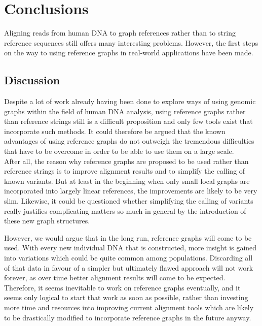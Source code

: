 \documentclass[a4paper,12pt,twoside,BCOR=10mm]{scrbook}
\begin{document}
\chapter{Conclusions}
%

Aligning reads from human DNA to graph references rather than to string reference sequences 
still offers many interesting problems. 
However, the first steps on the way to using reference graphs in real-world applications have been made.

\section{Discussion}

Despite a lot of work already having been done to explore 
ways of using genomic graphs within the field of human DNA analysis, 
using reference graphs rather than reference strings still 
is a difficult proposition and only few tools exist that incorporate 
such methods. 
It could therefore be argued that the known advantages of using reference 
graphs do not outweigh the tremendous difficulties that have to 
be overcome in order to be able to use them on a large scale. \\
After all, the reason why reference graphs are proposed to be used 
rather than reference strings is to improve alignment results 
and to simplify the calling of known variants. 
But at least in the beginning when only small local graphs are incorporated 
into largely linear references, the improvements are likely to be very slim. 
Likewise, it could be questioned whether simplifying the calling of variants really 
justifies complicating matters so much in general by the introduction of 
these new graph structures.

However, we would argue that in the long run, reference graphs will come to be used. 
With every new individual DNA that is constructed, more insight is gained into 
variations which could be quite common among populations. 
Discarding all of that data in favour of a simpler but ultimately flawed approach 
will not work forever, as over time better alignment results will come to be expected. \\
Therefore, it seems inevitable to work on reference graphs eventually, 
and it seems only logical to start that work as soon as possible, rather than investing 
more time and resources into improving current alignment tools which are likely to be drastically 
modified to incorporate reference graphs in the future anyway.
\end{document}
